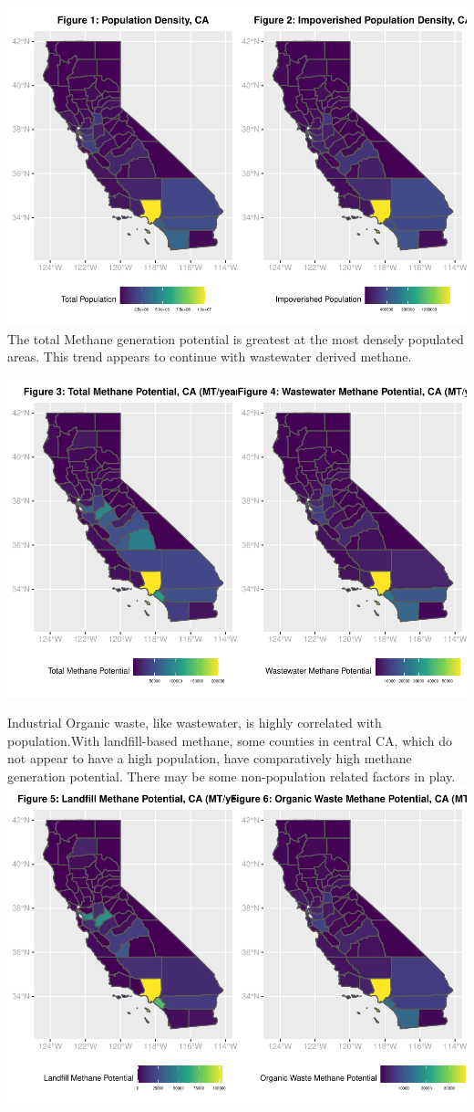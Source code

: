 \documentclass[
  12pt,
]{article}
\begin{document}
\includegraphics{FDR_ProjectReport_files/figure-latex/unnamed-chunk-3-1.pdf}
The total Methane generation potential is greatest at the most densely
populated areas. This trend appears to continue with wastewater derived
methane.

\includegraphics{FDR_ProjectReport_files/figure-latex/unnamed-chunk-4-1.pdf}

Industrial Organic waste, like wastewater, is highly correlated with
population.With landfill-based methane, some counties in central CA,
which do not appear to have a high population, have comparatively high
methane generation potential. There may be some non-population related
factors in play.
\includegraphics{FDR_ProjectReport_files/figure-latex/unnamed-chunk-5-1.pdf}
\end{document}
